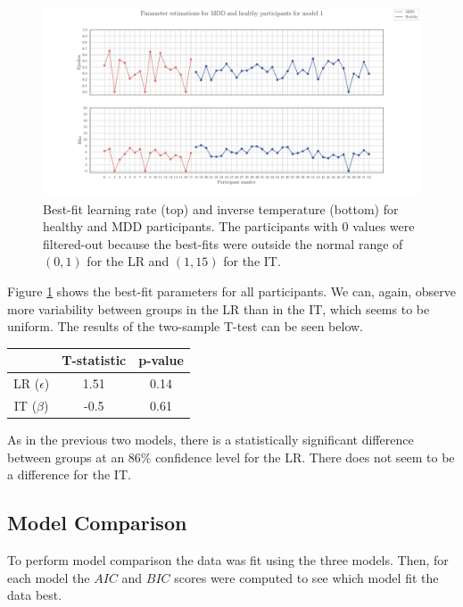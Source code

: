 \documentclass[12pt]{article}
\begin{document}
\begin{figure}[h!]
	\centering
	\hspace*{-0.6in}
	\includegraphics[width=1.1\linewidth]{figures/2.6.1.pdf}
	\caption{Best-fit learning rate (top) and inverse temperature (bottom) for healthy and MDD participants. The participants with 0 values were filtered-out because the best-fits were outside the normal range of $(0,1)$ for the LR and $(1, 15)$ for the IT.}
	\label{fig:2.6.2}
\end{figure}

Figure \ref{fig:2.6.2} shows the best-fit parameters for all participants. We can, again, observe more variability between groups in the LR than in the IT, which seems to be uniform. The results of the two-sample T-test can be seen below.

\begin{center}
 \begin{tabular}{|c || c | c |} 
 \hline
  & T-statistic & p-value  \\ [0.5ex] 
 \hline\hline
 LR ($\epsilon$) & 1.51 & 0.14 \\
 \hline
 IT ($\beta$) & -0.5 & 0.61 \\ [1ex] 
 \hline
\end{tabular}
\end{center}

As in the previous two models, there is a statistically significant difference between groups at an 86\% confidence level for the LR. There does not seem to be a difference for the IT.

\subsection{Model Comparison}
\label{sec:model-comparison}
To perform model comparison the data was fit using the three models. Then, for each model the $AIC$ and $BIC$ scores were computed to see which model fit the data best. 
\end{document}
